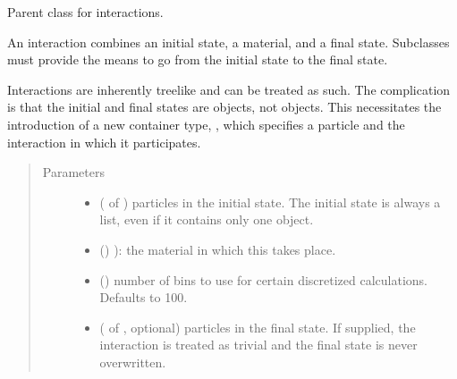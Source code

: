 \documentclass[letterpaper,10pt,english]{sphinxmanual}
\begin{document}

\begin{fulllineitems}
\label{\detokenize{code_structure:scdc.interaction.Interaction}}
Parent class for interactions.

An interaction combines an initial state, a material, and a final state.
Subclasses must provide the means to go from the initial state to the final
state.

Interactions are inherently treelike and can be treated as such. The
complication is that the initial and final states are  objects,
not  objects. This necessitates the introduction of a new
container type, , which specifies a particle and
the interaction in which it participates.
\begin{quote}\begin{description}
\item[{Parameters}] \leavevmode\begin{itemize}
\item {} 
 ( of ) \textendash{} particles in the
initial state. The initial state is always a list, even if it
contains only one object.

\item {} 
\sphinxstyleliteralstrong{\sphinxupquote{(}} () \textendash{} ): the material in which this takes place.

\item {} 
 (\sphinxstyleliteralemphasis{\sphinxupquote{, }}) \textendash{} number of bins to use for certain discretized
calculations. Defaults to 100.

\item {} 
 ( of , optional) \textendash{} particles in
the final state. If supplied, the interaction is treated as trivial
and the final state is never overwritten.


\end{itemize}
\end{description}
\end{quote}
\end{fulllineitems}
\end{document}
